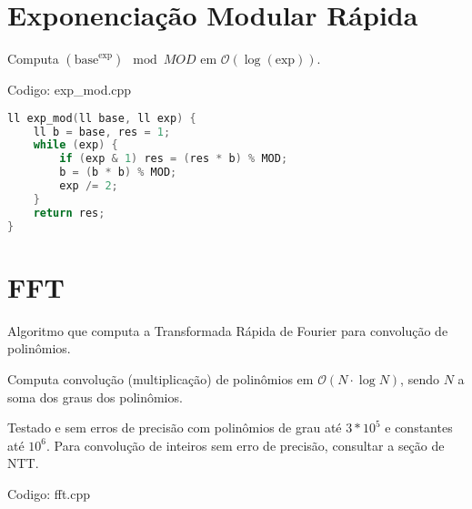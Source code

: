 \documentclass[10pt, a4paper, oneside]{book}
\begin{document}
\section{Exponenciação Modular Rápida}


Computa $(\text{base} ^ \text{exp}) \mod MOD$ em $\mathcal{O}(\log(\text{exp}))$.
\hfill

Codigo: exp\_mod.cpp

\begin{lstlisting}[language=C++]
ll exp_mod(ll base, ll exp) {
    ll b = base, res = 1;
    while (exp) {
        if (exp & 1) res = (res * b) % MOD;
        b = (b * b) % MOD;
        exp /= 2;
    }
    return res;
}
\end{lstlisting}
\hfill

\section{FFT}


Algoritmo que computa a Transformada Rápida de Fourier para convolução de polinômios.



Computa convolução (multiplicação) de polinômios em $\mathcal{O}(N \cdot \log N)$, sendo $N$ a soma dos graus dos polinômios.



Testado e sem erros de precisão com polinômios de grau até $3 * 10^5$ e constantes até $10^6$. Para convolução de inteiros sem erro de precisão, consultar a seção de NTT.

\hfill

Codigo: fft.cpp
\end{document}
